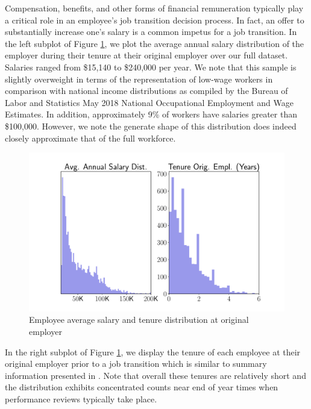 \documentclass[10pt]{article}
\begin{document}
Compensation, benefits, and other forms of financial remuneration typically play 
a critical role in an employee's job transition decision process.  In fact, an offer to 
substantially increase one's salary is a common impetus for a job transition. 
In the left subplot of Figure \ref{fig:avgsal}, we plot the average 
annual salary distribution 
of the employer during their tenure at their original employer over our full dataset.  
Salaries ranged from \$15,140 to \$240,000 per year.  We note that this sample 
is slightly overweight in terms of the representation of low-wage workers 
in comparison with national income distributions as compiled 
by the Bureau of Labor and Statistics May 2018 National Occupational 
Employment and Wage Estimates. In addition, 
approximately 9\% of workers have salaries greater than \$100,000. 
However, we note the generate shape of this distribution does indeed closely approximate 
that of the full workforce.
%
\begin{figure}[thb]
    \centering
	\includegraphics[width=1.0\linewidth]{avgsal.pdf}
	\caption{Employee average salary and tenure distribution at original employer}
	\label{fig:avgsal}
\end{figure}
%
In the right subplot of Figure \ref{fig:avgsal}, we display the tenure of each 
employee at their original employer prior to a job transition which is similar to
summary information presented in \cite{Smart2016}. Note that overall these tenures 
are relatively short and the distribution exhibits concentrated counts near end of year 
times when performance reviews typically take place.  
\end{document}
